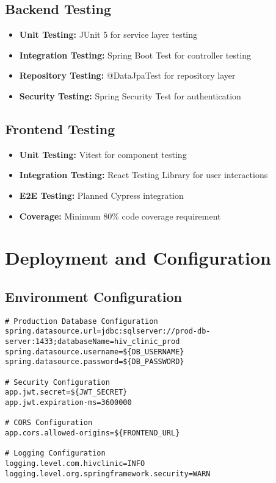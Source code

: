 \documentclass[12pt,a4paper]{article}
\begin{document}
\subsection{Backend Testing}

\begin{itemize}
    \item \textbf{Unit Testing:} JUnit 5 for service layer testing
    \item \textbf{Integration Testing:} Spring Boot Test for controller testing
    \item \textbf{Repository Testing:} @DataJpaTest for repository layer
    \item \textbf{Security Testing:} Spring Security Test for authentication
\end{itemize}

\subsection{Frontend Testing}

\begin{itemize}
    \item \textbf{Unit Testing:} Vitest for component testing
    \item \textbf{Integration Testing:} React Testing Library for user interactions
    \item \textbf{E2E Testing:} Planned Cypress integration
    \item \textbf{Coverage:} Minimum 80\% code coverage requirement
\end{itemize}

\section{Deployment and Configuration}

\subsection{Environment Configuration}

\begin{lstlisting}[language=properties, caption=Production Configuration]
# Production Database Configuration
spring.datasource.url=jdbc:sqlserver://prod-db-server:1433;databaseName=hiv_clinic_prod
spring.datasource.username=${DB_USERNAME}
spring.datasource.password=${DB_PASSWORD}

# Security Configuration
app.jwt.secret=${JWT_SECRET}
app.jwt.expiration-ms=3600000

# CORS Configuration
app.cors.allowed-origins=${FRONTEND_URL}

# Logging Configuration
logging.level.com.hivclinic=INFO
logging.level.org.springframework.security=WARN
\end{lstlisting}
\end{document}
